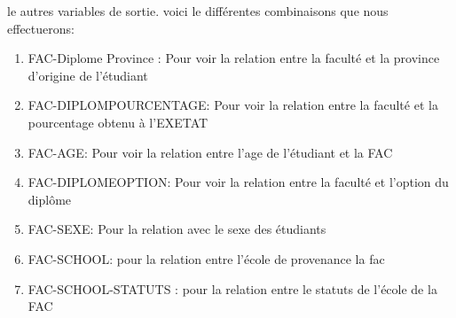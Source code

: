 le autres variables de sortie. voici le différentes combinaisons que
 nous  effectuerons: 
 \begin{enumerate}
 	\item FAC-Diplome Province : Pour voir la relation
 	entre la faculté et la province d'origine de l'étudiant
 	\item FAC-DIPLOMPOURCENTAGE: Pour voir la relation entre la faculté et la
 	pourcentage obtenu à l'\ac{EXETAT}
 	\item FAC-AGE: Pour voir la relation entre
 	l'age de l'étudiant et la FAC
 	\item FAC-DIPLOMEOPTION: Pour voir la
 	relation entre la faculté et l'option du diplôme
 	\item FAC-SEXE: Pour la
 	relation avec le sexe des étudiants 
 	\item FAC-SCHOOL: pour la relation
 	entre l'école de provenance la fac 
 	\item FAC-SCHOOL-STATUTS : pour la relation
 	entre le statuts de l'école de la FAC
 \end{enumerate}
